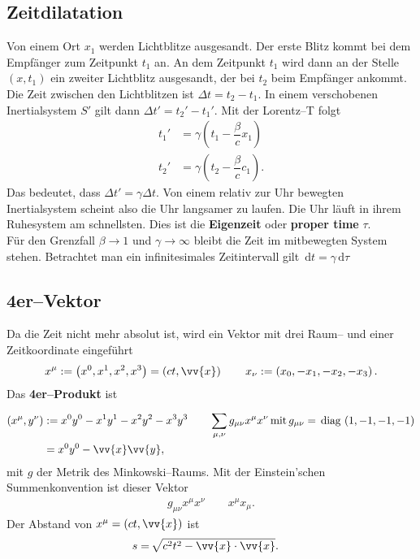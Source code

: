 \documentclass[a4paper,12pt]{article}
\newcommand{\td}{\,\text{d}}
\begin{document}
\subsection{Zeitdilatation}
Von einem Ort $x_1$ werden Lichtblitze ausgesandt. Der erste Blitz kommt bei dem Empfänger zum Zeitpunkt $t_1$ an. An dem Zeitpunkt $t_1$ wird dann an der Stelle $\left(x,t_1\right)$ ein zweiter Lichtblitz ausgesandt, der bei $t_2$ beim Empfänger ankommt. Die Zeit zwischen den Lichtblitzen ist $\Delta t=t_2-t_1$. In einem verschobenen Inertialsystem $S'$ gilt dann $\Delta t'=t_2'-t_1'$. Mit der Lorentz--T folgt
\begin{align*} 
        t_1'&=\gamma \left(t_1-\dfrac{\beta }{c}x_1\right)\\
        t_2'&=\gamma \left(t_2-\dfrac{\beta }{c}c_1\right)
.\end{align*} 
Das bedeutet, dass $\Delta t'=\gamma \Delta t$. Von einem relativ zur Uhr bewegten Inertialsystem scheint also die Uhr langsamer zu laufen. Die Uhr läuft in ihrem Ruhesystem am schnellsten. Dies ist die \textbf{Eigenzeit} oder \textbf{proper time} $\tau $.\\\indent
Für den Grenzfall $\beta \rightarrow 1$ und $\gamma \rightarrow \infty$ bleibt die Zeit im mitbewegten System stehen. Betrachtet man ein infinitesimales Zeitintervall gilt $\td t=\gamma \td \tau $ 

\subsection{4er--Vektor}
Da die Zeit nicht mehr absolut ist, wird ein Vektor mit drei Raum-- und einer Zeitkoordinate eingeführt
\begin{align*} 
        x^\mu :=\left(x^0,x^1,x^2,x^3\right)=\left(ct,\vv{x}\right)\qquad x_\nu :=\left(x_0,-x_1,-x_2,-x_3\right)
.\end{align*} 
Das \textbf{4er--Produkt} ist 
\begin{align*} 
        \left(x^\mu ,y^\nu \right)&:=x^0y^0-x^1y^1-x^2y^2-x^3y^3\qquad \sum_{\mu ,\nu }^{}g_{\mu \nu }x^\mu x^\nu\,\text{mit}\,g_{\mu \nu }=\,\text{diag}\,\left(1,-1,-1,-1\right)\\
                               &=x^0y^0-\vv{x}\vv{y}
,\end{align*} 
mit $g$ der Metrik des Minkowski--Raums. Mit der Einstein'schen Summenkonvention ist dieser Vektor
\begin{align*} 
        g_{\mu \nu }x^\mu x^\nu \qquad x^\mu x_\mu 
.\end{align*} 
Der Abstand von $x^\mu =\left(ct,\vv{x}\right)$ ist
\begin{align*} 
        s&=\,\sqrt[]{c^2t^2-\vv{x}\cdot \vv{x}}
.\end{align*} 
\end{document}
